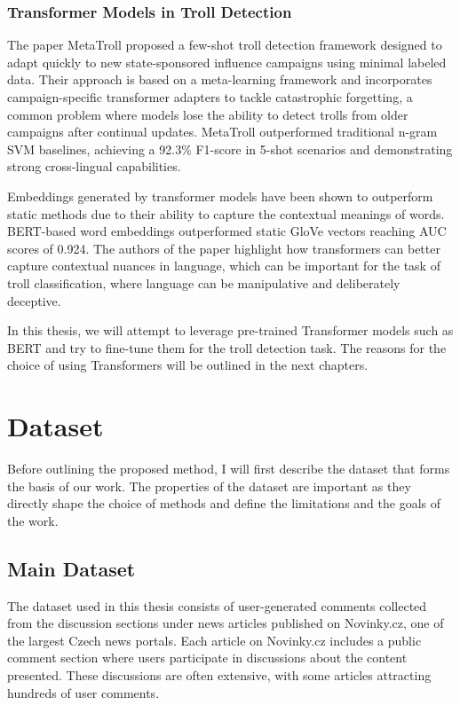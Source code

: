 \documentclass[twoside]{ctuthesis}
\theoremstyle{plain}
\theoremstyle{definition}
\theoremstyle{note}
\begin{document}
\subsection{Transformer Models in Troll Detection}
The paper MetaTroll proposed a few-shot troll detection framework designed to adapt quickly to new state-sponsored influence campaigns using minimal labeled data. Their approach is based on a meta-learning framework and incorporates campaign-specific transformer adapters to tackle catastrophic forgetting, a common problem where models lose the ability to detect trolls from older campaigns after continual updates. MetaTroll outperformed traditional n-gram SVM baselines, achieving a 92.3\% F1-score in 5-shot scenarios and demonstrating strong cross-lingual capabilities\cite{Tian2023}.\par
Embeddings generated by transformer models have been shown to outperform static methods due to their ability to capture the contextual meanings of words. BERT-based word embeddings outperformed static GloVe vectors reaching AUC scores of 0.924. The authors of the paper \cite{yilmaz2023} highlight how transformers can better capture contextual nuances in language, which can be important for the task of troll classification, where language can be manipulative and deliberately deceptive.

In this thesis, we will attempt to leverage pre-trained Transformer models such as BERT and try to fine-tune them for the troll detection task. The reasons for the choice of using Transformers will be outlined in the next chapters.\par

\chapter{Dataset}

Before outlining the proposed method, I will first describe the dataset that forms the basis of our work. The properties of the dataset are important as they directly shape the choice of methods and define the limitations and the goals of the work. \par

\section{Main Dataset}
The dataset used in this thesis consists of user-generated comments collected from the discussion sections under news articles published on Novinky.cz, one of the largest Czech news portals. Each article on Novinky.cz includes a public comment section where users participate in discussions about the content presented. These discussions are often extensive, with some articles attracting hundreds of user comments.\par
\end{document}
